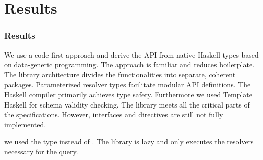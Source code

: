 \section{Results}

\begin{frame}\frametitle{Results}

\begin{itemize}
   We use a code-first approach and derive the API from native Haskell types based on data-generic programming. The approach is familiar and reduces boilerplate. The library architecture divides the functionalities into separate, coherent packages. Parameterized resolver types facilitate modular API definitions.
   The Haskell compiler primarily achieves type safety. Furthermore we used Template Haskell for schema validity checking. The library meets all the critical parts of the specifications. However, interfaces and directives are still not fully implemented. 

   we used the type  instead of . The library is lazy and only executes the resolvers necessary for the query. 

\end{itemize}
\end{frame}


